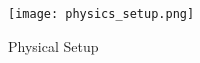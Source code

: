 ﻿\documentclass[reprint,amsmath,amssymb,aps,twoside]{revtex4-2}
\begin{document}
\begin{figure}
\begin{center}
\texttt{[image: physics\_setup.png]}
\end{center}
\caption{\label{fig:setup} Physical Setup}
\end{figure}

%
\end{document}
